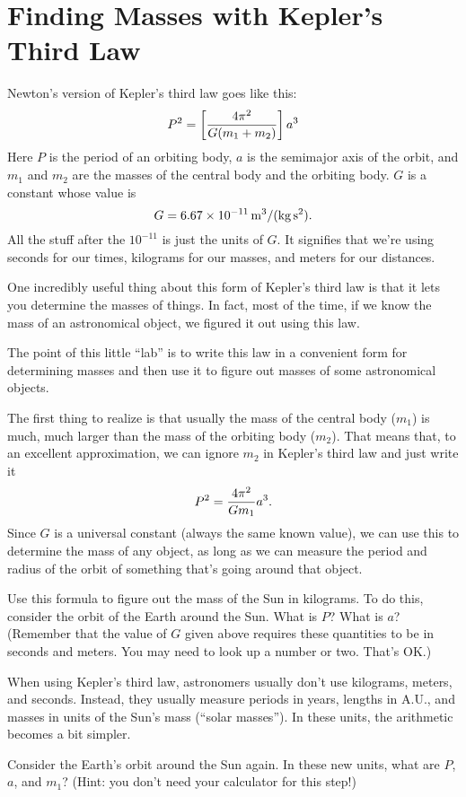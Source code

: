\chapter{Finding Masses with Kepler's Third Law}


Newton's version of Kepler's third law goes like this:
$$
P^2=\left[4\pi^2\over G(m_1+m_2)\right]a^3
$$
Here $P$ is the period of an orbiting body, $a$ is the semimajor axis
of the orbit, and $m_1$ and $m_2$ are the masses of the central body
and the orbiting body.  $G$ is a constant whose value is
$$
G=6.67\times 10^{-11}\,{\rm m^3/(kg\,s^2)}.
$$
All the stuff after the $10^{-11}$ is just the units of $G$.
It signifies that we're using seconds for our times, kilograms for
our masses, and meters for our distances.

One incredibly useful thing about this form of Kepler's third law
is that it lets you determine the masses of things.  In fact, most
of the time, if we know the mass of an astronomical object, we figured
it out using this law.

The point of this little ``lab'' is to write this law in a convenient
form for determining masses and then use it to figure out 
masses of some astronomical objects.

The first thing to realize is that usually the mass of the central
body ($m_1$) is much, much larger than the mass of the orbiting
body ($m_2$).  That means that, to an excellent approximation, we can
ignore $m_2$ in Kepler's third law and just write it
$$
P^2={4\pi^2\over Gm_1}a^3.
$$
Since $G$ is a universal constant (always the same known value), 
we can use this to determine the mass of any object, as long as we 
can measure the period and radius of the orbit of something
that's going around that object.

Use this formula to figure out the mass of the Sun in kilograms.  To do this,
consider the orbit of the Earth around the Sun.  What is $P$?
What is $a$?  (Remember that the value of $G$ given above requires
these quantities to be in seconds and meters. You may need to look
up a number or two. That's OK.)

\vskip 2in

When using Kepler's third law, astronomers usually don't use kilograms,
meters, and seconds.  Instead, they usually measure periods in years,
lengths in A.U., and masses in units of the Sun's mass (``solar masses'').
In these units, the arithmetic becomes a bit simpler.

Consider the Earth's orbit around the Sun again.  In these new units,
what are $P$, $a$, and $m_1$?  (Hint: you don't need your calculator for
this step!)

